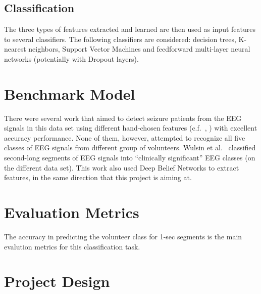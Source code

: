 \documentclass[12pt]{article}
\begin{document}
\subsection{Classification}

The three types of features extracted and learned are then used as input features to several classifiers. The following classifiers are considered: decision trees, K-nearest neighbors, Support Vector Machines and feedforward multi-layer neural networks (potentially with Dropout layers).

\section{Benchmark Model}

There were several work that aimed to detect seizure patients from the EEG signals in this data set using different hand-chosen features (c.f.~\cite{nigam2004neural}, \cite{kabir2016epileptic}) with excellent accuracy performance. None of them, however, attempted to recognize all five classes of EEG signals from different group of volunteers. Wulsin et al.~\cite{wulsin2011modeling} classified second-long segments of EEG signals into ``clinically significant'' EEG classes (on the different data set). This work also used Deep Belief Networks to extract features, in the same direction that this project is aiming at.

\section{Evaluation Metrics}

The accuracy in predicting the volunteer class for 1-sec segments is the main evalution metrics for this classification task.

\section{Project Design}



\end{document}
